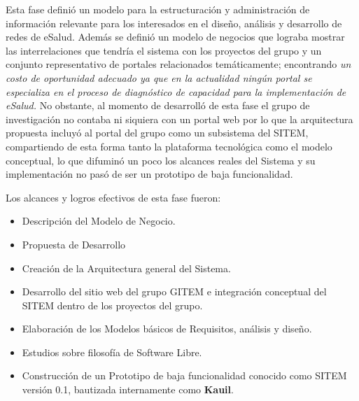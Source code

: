 Esta fase definió un modelo para la estructuración y administración de información relevante para los interesados en el diseño, análisis y desarrollo de redes de eSalud. Además se definió un modelo de negocios que lograba mostrar las interrelaciones que tendría el sistema con los proyectos del grupo y un conjunto representativo de portales relacionados temáticamente; encontrando \textit{un costo de oportunidad adecuado ya que en la actualidad ningún portal se especializa en el proceso de diagnóstico de capacidad para la implementación de eSalud.} No obstante, al momento de desarrolló de esta fase el grupo de investigación no contaba ni siquiera con un portal web por lo que la arquitectura propuesta incluyó al portal del grupo como un subsistema del SITEM, compartiendo de esta forma tanto la plataforma tecnológica como el modelo conceptual, lo que difuminó un poco los alcances reales del Sistema y su implementación no pasó de ser un prototipo de baja funcionalidad. 

Los alcances y logros efectivos de esta fase fueron:

\begin{itemize}
\item Descripción del Modelo de Negocio.
\item Propuesta de Desarrollo
\item Creación de la Arquitectura general del Sistema.
\item Desarrollo del sitio web del grupo GITEM e integración conceptual del SITEM dentro de los proyectos del grupo.
\item Elaboración de los Modelos básicos de Requisitos, análisis y diseño.
\item Estudios sobre filosofía de Software Libre.
\item Construcción de un Prototipo de baja funcionalidad conocido como SITEM versión 0.1, bautizada internamente como \textbf{Kauil}.
\end{itemize}


